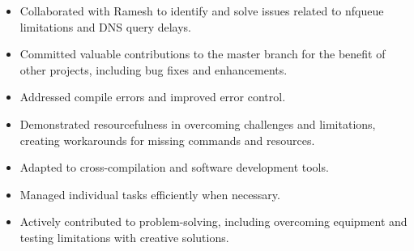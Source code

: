 \begin{itemize}
\begin{itemize}
      \item Collaborated with Ramesh to identify and solve issues related to nfqueue limitations and DNS query delays.
      \item Committed valuable contributions to the master branch for the benefit of other projects, including bug fixes and enhancements.
      \item Addressed compile errors and improved error control.
      \item Demonstrated resourcefulness in overcoming challenges and limitations, creating workarounds for missing commands and resources.
      \item Adapted to cross-compilation and software development tools.
      \item Managed individual tasks efficiently when necessary.
      \item Actively contributed to problem-solving, including overcoming equipment and testing limitations with creative solutions.
    \end{itemize}
\end{itemize}


